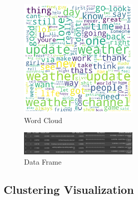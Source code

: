 \documentclass[a4paper,11pt]{article}
\begin{document}
\begin{figure}[h!]
    \centering
    \includegraphics[width=0.5\textwidth]{word_cloud_a2.png}
    \caption{Word Cloud}
    \label{fig:wc}
\end{figure}

\begin{figure}[h!]
    \centering
    \includegraphics[width=0.5\textwidth]{df.png}
    \caption{Data Frame}
    \label{fig:df}
\end{figure}

\FloatBarrier

\subsection{Clustering Visualization}
\end{document}
